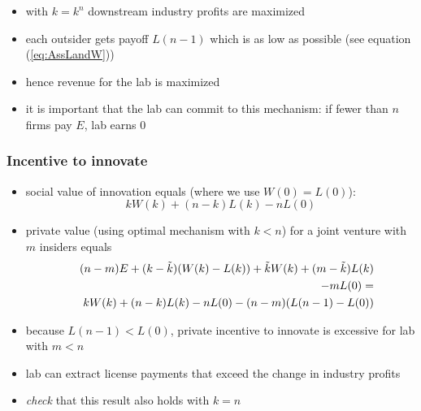 \documentclass[11pt,english]{beamer}
\begin{document}
\begin{frame}[allowframebreaks]
\begin{itemize}
\begin{itemize}
\item with $k=k^{n}$ downstream industry profits are maximized\\
\label{sec-2-6-7-1}%
\item each outsider gets payoff $L(n-1)$ which is as low as possible (see equation (\ref{eq:AssLandW}))\\
\label{sec-2-6-7-2}%
\item hence revenue for the lab is maximized\\
\label{sec-2-6-7-3}%
\item it is important that the lab can commit to this mechanism: if fewer than $n$ firms pay $E$, lab earns 0\\
\label{sec-2-6-7-4}%
\end{itemize} %
\end{itemize} %
\end{frame}
\begin{frame}[allowframebreaks]\frametitle{Incentive to innovate}
\label{sec-2-7}
\begin{itemize}

\item social value of innovation equals (where we use $W(0)=L(0)$):
\label{sec-2-7-1}%
\begin{equation*}
kW(k) +(n-k)L(k) - nL(0)
\end{equation*}

\item private value (using optimal mechanism with $k<n$) for a joint venture with $m$ insiders equals
\label{sec-2-7-2}%
\begin{eqnarray*}
\hspace{-10mm} && (n-m)E + (k-\tilde k)(W(k)-L(k))+\tilde k W(k) + (m-\tilde k)L(k)
\\
&& -mL(0) = \\
&& kW(k) +(n-k)L(k) -n L(0) - (n-m) (L(n-1) - L(0))
\end{eqnarray*}
\item because $L(n-1)<L(0)$, private incentive to innovate is
  excessive for lab with $m<n$
\label{sec-2-7-3}%
\item lab can extract license payments that exceed the change in industry profits\\
\label{sec-2-7-4}%
\item  \emph{check} that this result also holds with $k=n$
\end{itemize} %
\end{frame}
\end{document}
